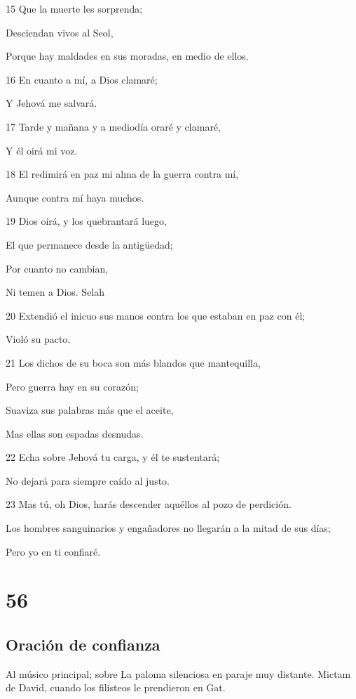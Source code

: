 \par 15 Que la muerte les sorprenda;
\par Desciendan vivos al Seol,
\par Porque hay maldades en sus moradas, en medio de ellos.
\par 16 En cuanto a mí, a Dios clamaré;
\par Y Jehová me salvará.
\par 17 Tarde y mañana y a mediodía oraré y clamaré,
\par Y él oirá mi voz.
\par 18 El redimirá en paz mi alma de la guerra contra mí,
\par Aunque contra mí haya muchos.
\par 19 Dios oirá, y los quebrantará luego,
\par El que permanece desde la antigüedad;
\par Por cuanto no cambian,
\par Ni temen a Dios. Selah
\par 20 Extendió el inicuo sus manos contra los que estaban en paz con él;
\par Violó su pacto.
\par 21 Los dichos de su boca son más blandos que mantequilla,
\par Pero guerra hay en su corazón;
\par Suaviza sus palabras más que el aceite,
\par Mas ellas son espadas desnudas.
\par 22 Echa sobre Jehová tu carga, y él te sustentará;
\par No dejará para siempre caído al justo.
\par 23 Mas tú, oh Dios, harás descender aquéllos al pozo de perdición.
\par Los hombres sanguinarios y engañadores no llegarán a la mitad de sus días;
\par Pero yo en ti confiaré.

\chapter{56}

\section*{Oración de confianza}

\par Al músico principal; sobre La paloma silenciosa en paraje muy distante. Mictam de David, cuando los filisteos le prendieron en Gat.  

